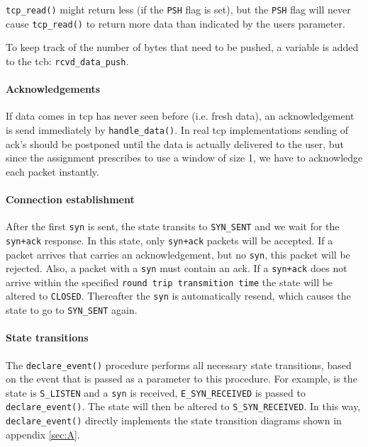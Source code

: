 \documentclass[11pt]{article}
\begin{document}
    \lstinline|tcp_read()| might return less (if the \lstinline|PSH| flag is set), but 
    the \lstinline|PSH| flag 
    will never cause \lstinline|tcp_read()| to return more 
    data than indicated by the users parameter.
    
    To keep track of the number of bytes that need to be pushed, a variable is 
    added to the tcb: \lstinline|rcvd_data_push|.

\paragraph{Acknowledgements}
    If data comes in tcp has never seen before (i.e. fresh data), an 
    acknowledgement is send
    immediately by \lstinline|handle_data()|. In real tcp implementations sending of
     ack's 
    should be postponed until the data is actually delivered to the user, 
    but since the assignment prescribes to use a window of size 1, we have to 
    acknowledge each packet instantly.

\paragraph{Connection establishment}
    After the first \lstinline|syn| is sent, 
    the state transits to \lstinline|SYN_SENT| 
    and we wait for the \lstinline|syn+ack| response. In this state, only 
    \lstinline|syn+ack| packets will be accepted. If a packet arrives that carries an
    acknowledgement, but no \lstinline|syn|, this packet will be rejected.
    Also, a packet with a \lstinline|syn| must contain an ack. 
    If a \lstinline|syn+ack| does not arrive within the specified 
    \lstinline|round trip transmition time| the state will be altered to 
    \lstinline|CLOSED|. Thereafter the \lstinline|syn| is automatically 
    resend, which causes the state to go to \lstinline|SYN_SENT| again.
    
    
\paragraph{State transitions}
    The \lstinline|declare_event()| procedure performs all necessary state 
    transitions, based on the event that is passed as a parameter to this 
    procedure. For example, 
    is the state is \lstinline|S_LISTEN| and a \lstinline|syn| is received, 
    \lstinline|E_SYN_RECEIVED| is passed to \lstinline|declare_event()|. The state will 
    then be altered to \lstinline|S_SYN_RECEIVED|. 
    In this way, \lstinline|declare_event()| directly implements the state 
    transition diagrams shown in appendix \ref{sec:A}.
    
\end{document}
